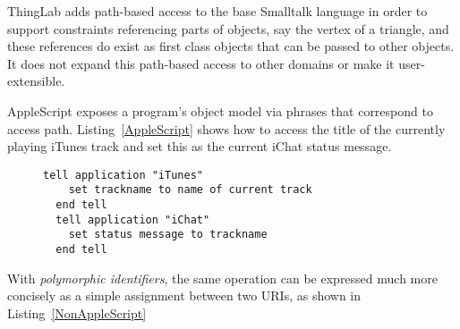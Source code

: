 \documentclass[preprint,authoryear]{acm_proc_article-sp}
\begin{document}
ThingLab\cite{thinglab}  adds path-based access to the base Smalltalk language in order to support
constraints referencing parts of objects, say the vertex of a triangle, and these
references do exist as first class objects that can be passed to other objects.
   It does not
expand this path-based access to other domains or make it user-extensible.

AppleScript\cite{applescript-hopl3} exposes a program's object model via
phrases that correspond to access path.  Listing~\ref{AppleScript} shows 
how to access the title of the currently playing iTunes track and set this
as the current iChat status message.


\begin{figure}[htbp]
\begin{lstlisting}[style=L,label= AppleScript,caption=Using AppleScript to set chat status from track name.]
  tell application "iTunes"
    set trackname to name of current track
  end tell
  tell application "iChat"
    set status message to trackname
  end tell
\end{lstlisting}
\end{figure}

With \emph{polymorphic identifiers}, the same operation can be expressed
much more concisely as a simple assignment between two URIs,
as shown in Listing~\ref{NonAppleScript}

\end{document}
